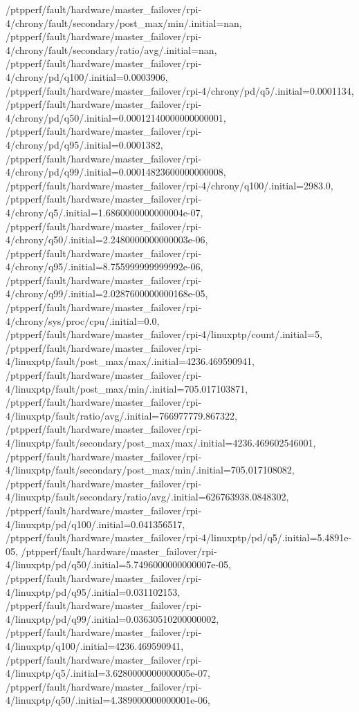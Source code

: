 {    /ptpperf/fault/hardware/master_failover/rpi-4/chrony/fault/secondary/post_max/min/.initial=nan,
    /ptpperf/fault/hardware/master_failover/rpi-4/chrony/fault/secondary/ratio/avg/.initial=nan,
    /ptpperf/fault/hardware/master_failover/rpi-4/chrony/pd/q100/.initial=0.0003906,
    /ptpperf/fault/hardware/master_failover/rpi-4/chrony/pd/q5/.initial=0.0001134,
    /ptpperf/fault/hardware/master_failover/rpi-4/chrony/pd/q50/.initial=0.00012140000000000001,
    /ptpperf/fault/hardware/master_failover/rpi-4/chrony/pd/q95/.initial=0.0001382,
    /ptpperf/fault/hardware/master_failover/rpi-4/chrony/pd/q99/.initial=0.00014823600000000008,
    /ptpperf/fault/hardware/master_failover/rpi-4/chrony/q100/.initial=2983.0,
    /ptpperf/fault/hardware/master_failover/rpi-4/chrony/q5/.initial=1.6860000000000004e-07,
    /ptpperf/fault/hardware/master_failover/rpi-4/chrony/q50/.initial=2.2480000000000003e-06,
    /ptpperf/fault/hardware/master_failover/rpi-4/chrony/q95/.initial=8.755999999999992e-06,
    /ptpperf/fault/hardware/master_failover/rpi-4/chrony/q99/.initial=2.0287600000000168e-05,
    /ptpperf/fault/hardware/master_failover/rpi-4/chrony/sys/proc/cpu/.initial=0.0,
    /ptpperf/fault/hardware/master_failover/rpi-4/linuxptp/count/.initial=5,
    /ptpperf/fault/hardware/master_failover/rpi-4/linuxptp/fault/post_max/max/.initial=4236.469590941,
    /ptpperf/fault/hardware/master_failover/rpi-4/linuxptp/fault/post_max/min/.initial=705.017103871,
    /ptpperf/fault/hardware/master_failover/rpi-4/linuxptp/fault/ratio/avg/.initial=766977779.867322,
    /ptpperf/fault/hardware/master_failover/rpi-4/linuxptp/fault/secondary/post_max/max/.initial=4236.469602546001,
    /ptpperf/fault/hardware/master_failover/rpi-4/linuxptp/fault/secondary/post_max/min/.initial=705.017108082,
    /ptpperf/fault/hardware/master_failover/rpi-4/linuxptp/fault/secondary/ratio/avg/.initial=626763938.0848302,
    /ptpperf/fault/hardware/master_failover/rpi-4/linuxptp/pd/q100/.initial=0.041356517,
    /ptpperf/fault/hardware/master_failover/rpi-4/linuxptp/pd/q5/.initial=5.4891e-05,
    /ptpperf/fault/hardware/master_failover/rpi-4/linuxptp/pd/q50/.initial=5.7496000000000007e-05,
    /ptpperf/fault/hardware/master_failover/rpi-4/linuxptp/pd/q95/.initial=0.031102153,
    /ptpperf/fault/hardware/master_failover/rpi-4/linuxptp/pd/q99/.initial=0.03630510200000002,
    /ptpperf/fault/hardware/master_failover/rpi-4/linuxptp/q100/.initial=4236.469590941,
    /ptpperf/fault/hardware/master_failover/rpi-4/linuxptp/q5/.initial=3.6280000000000005e-07,
    /ptpperf/fault/hardware/master_failover/rpi-4/linuxptp/q50/.initial=4.389000000000001e-06,
}
